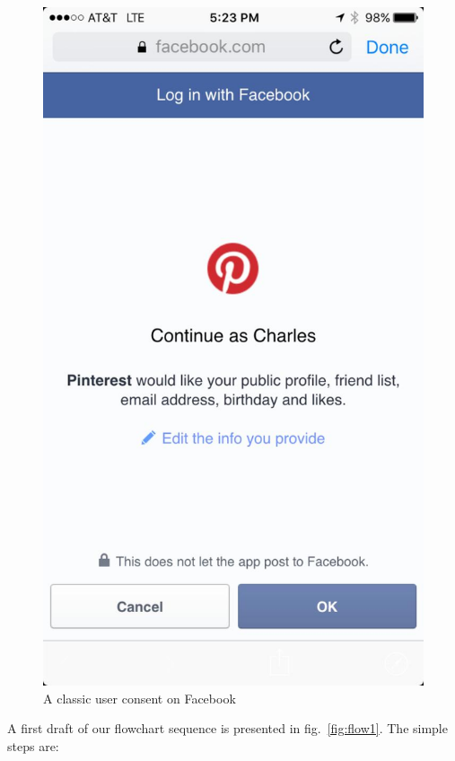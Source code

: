 \vspace{0.5cm}
\begin{figure}[h!]
    \centering
    \includegraphics[scale=0.45]{chapters/images/chp2/desktopaccess1.jpg}
    \caption{A classic user consent on Facebook}
    \label{fig:usercon1}
\end{figure}

A first draft of our flowchart sequence is presented in fig.~\ref{fig:flow1}. The simple steps are:

